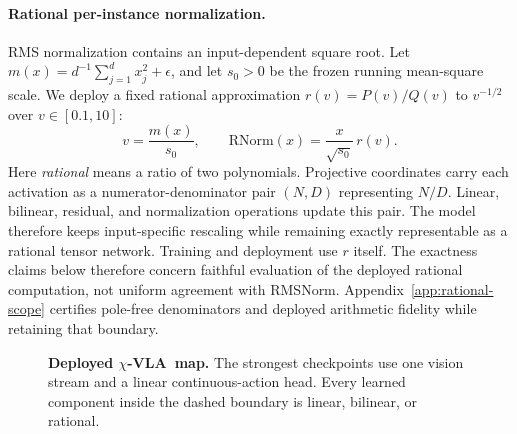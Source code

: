 \documentclass{article}
\newcommand{\chivla}{$\chi$-VLA}
\begin{document}
\paragraph{Rational per-instance normalization.}
RMS normalization contains an input-dependent square root. Let
$m(x)=d^{-1}\sum_{j=1}^{d}x_j^2+\epsilon$, and let $s_0>0$ be the frozen running mean-square
scale. We deploy a fixed rational approximation $r(v)=P(v)/Q(v)$ to $v^{-1/2}$ over
$v\in[0.1,10]$:
\begin{equation}
v=\frac{m(x)}{s_0}, \qquad
\mathrm{RNorm}(x)=\frac{x}{\sqrt{s_0}}\,r(v).
\label{eq:rnorm}
\end{equation}
Here \emph{rational} means a ratio of two polynomials. Projective coordinates carry each
activation as a numerator-denominator pair $(N,D)$ representing $N/D$. Linear, bilinear,
residual, and normalization operations update this pair. The model therefore keeps
input-specific rescaling while remaining exactly representable as a rational tensor network.
Training and deployment use $r$ itself. The exactness claims below therefore concern faithful
evaluation of the deployed rational computation, not uniform agreement with RMSNorm.
Appendix~\ref{app:rational-scope} certifies pole-free denominators and deployed arithmetic
fidelity while retaining that boundary.

\begin{figure}[H]
\centering
{}
\caption{\textbf{Deployed \chivla\ map.} The strongest checkpoints use one vision stream and a
linear continuous-action head. Every learned component inside the dashed boundary is linear,
bilinear, or rational.}
\label{fig:architecture}
\end{figure}
\end{document}
